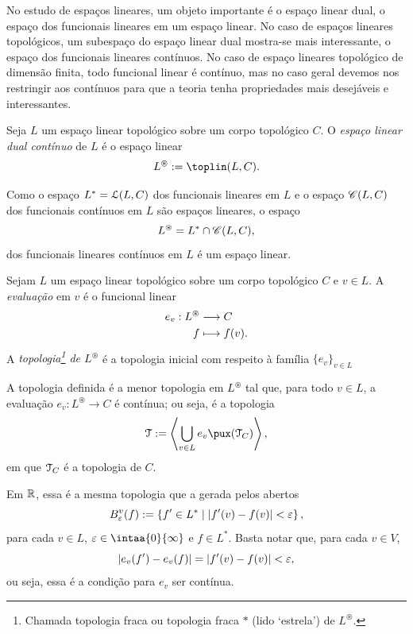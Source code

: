 No estudo de espaços lineares, um objeto importante é o espaço linear dual, o espaço dos funcionais lineares em um espaço linear. No caso de espaços lineares topológicos, um subespaço do espaço linear dual mostra-se mais interessante, o espaço dos funcionais lineares contínuos. No caso de espaço lineares topológico de dimensão finita, todo funcional linear é contínuo, mas no caso geral devemos nos restringir aos contínuos para que a teoria tenha propriedades mais desejáveis e interessantes.

\begin{defi}
Seja $L$ um espaço linear topológico sobre um corpo topológico $C$. O \emph{espaço linear dual contínuo} de $L$ é o espaço linear
	\begin{equation*}
	L^\circledast := \toplin(L,C).
	\end{equation*}
\end{defi}

Como o espaço $L^* = \mathcal{L}(L,C)$ dos funcionais lineares em $L$ e o espaço $\mathscr{C}(L,C)$ dos funcionais contínuos em $L$ são espaços lineares, o espaço
	\begin{equation*}
	L^\circledast = L^* \cap \mathscr{C}(L,C),
	\end{equation*}
dos funcionais lineares contínuos em $L$ é um espaço linear.

\begin{defi}
Sejam $L$ um espaço linear topológico sobre um corpo topológico $C$ e $v \in L$. A \emph{evaluação} em $v$ é o funcional linear
	\begin{align*}
	{e_v}: {L^\circledast} &\longrightarrow {C} \\{f} &\longmapsto {f(v)}.
	\end{align*}
A \emph{topologia\footnote{Chamada topologia fraca ou topologia fraca $*$ (lido `estrela') de $L^\circledast$.} de $L^\circledast$} é a topologia inicial com respeito à família $\{e_v\}_{v \in L}$
\end{defi}

A topologia definida é a menor topologia em $L^\circledast$ tal que, para todo $v \in L$, a evaluação $e_v\colon L^\circledast \to C$ é contínua; ou seja, é a topologia
	\begin{equation*}
	\topo := \ger{\bigcup_{v \in L} {e_v}\pux(\topo_C)},
	\end{equation*}
em que $\mathcal{T}_C$ é a topologia de $C$.

Em $\mathbb{R}$, essa é a mesma topologia que a gerada pelos abertos
	\begin{equation*}
	B^v_\varepsilon(f) := \left\{f' \in L^* \;\middle\vert\; \left\vert{f'(v)-f(v)}\right\vert < \varepsilon \right\},
	\end{equation*}
para cada $v \in L$, $\varepsilon \in \intaa{0}{\infty}$ e $f \in L^*$. Basta notar que, para cada $v \in V$,
	\begin{equation*}
	\left\vert{e_v(f') - e_v(f)}\right\vert = \left\vert{f'(v)-f(v)}\right\vert < \varepsilon,
	\end{equation*}
ou seja, essa é a condição para $e_v$ ser contínua.



